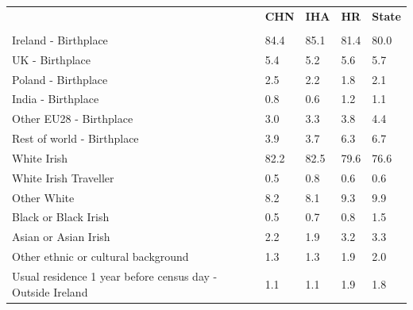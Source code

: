 \documentclass{article}
\begin{document}
\pagebreak
\begin{table}[h]	
\centering
		\begin{tabular}{KTTTT}
  \hline
& \textbf{CHN} & \textbf{IHA} & \textbf{HR}& \textbf{State}\\ 
  \hline
    \\ 
    \hline
Ireland - Birthplace & 84.4& 85.1& 81.4& 80.0\\
UK - Birthplace & 5.4& 5.2& 5.6& 5.7\\
Poland - Birthplace & 2.5& 2.2& 1.8& 2.1\\
India - Birthplace & 0.8& 0.6& 1.2& 1.1\\
Other EU28 - Birthplace & 3.0& 3.3& 3.8& 4.4\\
Rest of world - Birthplace & 3.9& 3.7& 6.3& 6.7\\
    \hline
White Irish & 82.2& 82.5& 79.6& 76.6\\
White Irish Traveller & 0.5& 0.8& 0.6& 0.6\\
Other White & 8.2& 8.1& 9.3& 9.9\\
Black or Black Irish & 0.5& 0.7& 0.8& 1.5\\
Asian or Asian Irish & 2.2& 1.9& 3.2& 3.3\\
Other ethnic or cultural background & 1.3& 1.3& 1.9& 2.0\\
    \hline
Usual residence 1 year before census day - Outside Ireland & 1.1& 1.1& 1.9& 1.8\\


\end{tabular}
\end{table}
\end{document}
